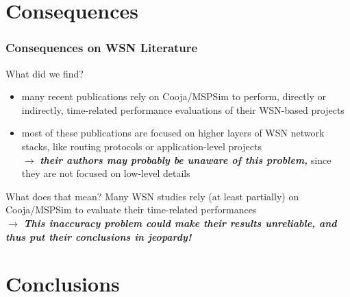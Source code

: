 \documentclass[10pt,c]{beamer}
\renewcommand{\emph}[1]{\textbf{\textit{#1}}}
\begin{document}

\section{Consequences}

\begin{frame}
\vspace{-0.25cm}
\frametitle{Consequences on WSN Literature}
\begin{block}{What did we find?}
\begin{itemize}
\item many recent publications rely on Cooja/MSPSim to perform, directly
or indirectly, time-related performance evaluations of their WSN-based
projects
\cite{Constrain-Routing-Trees-2014} \cite{DINAS-2014}
\cite{Efficient-Distrib-Svc-Discovery-2014} \cite{IETF-Routing-WSN-2014}
\cite{TinySDN-2014} \cite{Trickle-L2-2014}
\cite{Visual-Sensor-Networks-2014} \cite{Key-Mgmt-2015}
\item most of these publications are focused on higher layers of WSN
network stacks, like routing protocols 
\cite{Constrain-Routing-Trees-2014}
\cite{IETF-Routing-WSN-2014} \cite{Trickle-L2-2014}
or application-level projects
\cite{DINAS-2014} \cite{Efficient-Distrib-Svc-Discovery-2014}
\cite{Visual-Sensor-Networks-2014} \cite{Key-Mgmt-2015} \\
$\rightarrow$ \emph{their authors may probably be unaware of this problem,}
since they are not focused on low-level details
\end{itemize}
\end{block}
\vspace{-0.25cm}
\begin{alertblock}{What does that mean?}
Many WSN studies rely (at least partially) on Cooja/MSPSim to evaluate
their time-related performances \\
$\rightarrow$ \emph{This inaccuracy problem could make their results
unreliable, and thus put their conclusions in jeopardy!}
\end{alertblock}
\end{frame}


\section{Conclusions}
\end{document}

